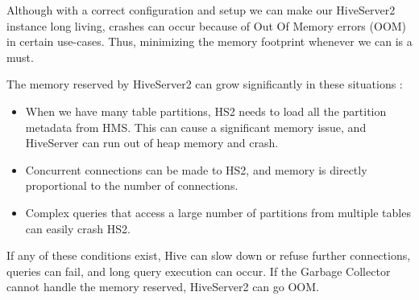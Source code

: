 Although with a correct configuration and setup we can make our HiveServer2 instance long living, crashes can occur because of Out Of Memory errors (OOM) in certain use-cases. Thus, minimizing the memory footprint whenever we can is a must.

\noindent The memory reserved by HiveServer2 can grow significantly in these situations  \cite{Hive-memory-problems}: 
\begin{itemize}
	\item When we have many table partitions, HS2 needs to load all the partition metadata from HMS. This can cause a significant memory issue, and HiveServer can run out of heap memory and crash.
	\item Concurrent connections can be made to HS2, and memory is directly proportional to the number of connections. 
	\item Complex queries that access a large number of partitions from multiple tables can easily crash HS2.
\end{itemize}

If any of these conditions exist, Hive can slow down or refuse further connections, queries can fail, and long query execution can occur. If the Garbage Collector cannot handle the memory reserved, HiveServer2 can go OOM.
